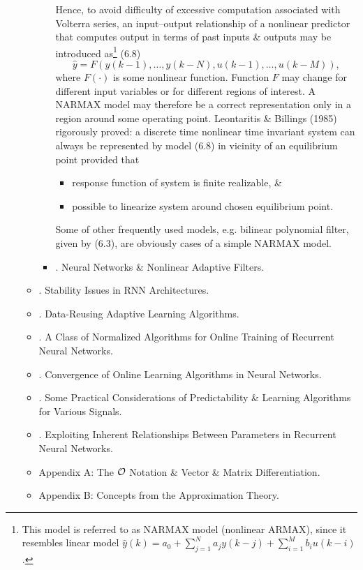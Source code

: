 \documentclass{article}
\begin{document}
\begin{enumerate}
\begin{itemize}
\begin{itemize}
			Hence, to avoid difficulty of excessive computation associated with Volterra series, an input--output relationship of a nonlinear predictor that computes output in terms of past inputs \& outputs may be introduced as\footnote{This model is referred to as NARMAX model (nonlinear ARMAX), since it resembles linear model $\hat{y}(k) = a_0 + \sum_{j=1}^N a_jy(k - j) + \sum_{i=1}^M b_iu(k - i)$.} (6.8)
			\begin{equation}
				\hat{y} = F(y(k - 1),\ldots,y(k - N),u(k - 1),\ldots,u(k - M)),
			\end{equation}
			where $F(\cdot)$ is some nonlinear function. Function $F$ may change for different input variables or for different regions of interest. A NARMAX model may therefore be a correct representation only in a region around some operating point. Leontaritis \& Billings (1985) rigorously proved: a discrete time nonlinear time invariant system can always be represented by model (6.8) in vicinity of an equilibrium point provided that
			\begin{itemize}
				\item response function of system is finite realizable, \&
				\item possible to linearize system around chosen equilibrium point.
			\end{itemize}
			Some of other frequently used models, e.g. bilinear polynomial filter, given by (6.3), are obviously cases of a simple NARMAX model.
			\item {. Neural Networks \& Nonlinear Adaptive Filters.}
		\end{itemize}
		\item {. Stability Issues in RNN Architectures.}
		\item {. Data-Reusing Adaptive Learning Algorithms.}
		\item {. A Class of Normalized Algorithms for Online Training of Recurrent Neural Networks.}
		\item {. Convergence of Online Learning Algorithms in Neural Networks.}
		\item {. Some Practical Considerations of Predictability \& Learning Algorithms for Various Signals.}
		\item {. Exploiting Inherent Relationships Between Parameters in Recurrent Neural Networks.}
		\item {\sf Appendix A: The ${\cal O}$ Notation \& Vector \& Matrix Differentiation.}
		\item {\sf Appendix B: Concepts from the Approximation Theory.}

\end{itemize}
\end{enumerate}
\end{document}
